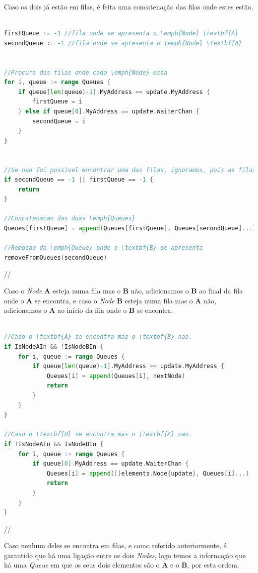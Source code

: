 Caso os dois já estão em filas, é feita uma concatenação das filas onde estes estão.
\begin{lstlisting}[caption={Alterações nas filas caso o \emph{Node} seja do tipo ``Waiter With Request'' e ambos os \emph{Nodes} \textbf{A} e \textbf{B} se apresentam em filas },language=Go]

firstQueue := -1 //fila onde se apresenta o \emph{Node} \textbf{A}
secondQueue := -1 //fila onde se apresenta o \emph{Node} \textbf{A}


//Procura das filas onde cada \emph{Node} esta
for i, queue := range Queues {
	if queue[len(queue)-1].MyAddress == update.MyAddress {
		firstQueue = i
	} else if queue[0].MyAddress == update.WaiterChan {
		secondQueue = i
	}
}


//Se nao foi possivel encontrar uma das filas, ignoramos, pois as filas ja se encontram juntas
if secondQueue == -1 || firstQueue == -1 {
	return
}

//Concatenacao das duas \emph{Queues}
Queues[firstQueue] = append(Queues[firstQueue], Queues[secondQueue]...)

//Remocao da \emph{Queue} onde o \textbf{B} se apresenta
removeFromQueues(secondQueue)
\end{lstlisting}//



Caso o \emph{Node} \textbf{A} esteja numa fila mas o \textbf{B} não, adicionamos o \textbf{B} ao final da fila onde o \textbf{A} se encontra, e
caso o \emph{Node} \textbf{B} esteja numa fila mas o \textbf{A} não, adicionamos o \textbf{A} ao início da fila onde o \textbf{B} se encontra.
\begin{lstlisting}[caption={Alterações nas filas caso o \emph{Node} seja do tipo ``Waiter With Request'' e pelo menos um se apresenta numa fila. },language=Go]

//Caso o \textbf{A} se encontra mas o \textbf{B} nao.
if IsNodeAIn && !IsNodeBIn {
	for i, queue := range Queues {
		if queue[len(queue)-1].MyAddress == update.MyAddress {
			Queues[i] = append(Queues[i], nextNode)
			return
		}
	}
}

//Caso o \textbf{B} se encontra mas o \textbf{A} nao.
if !IsNodeAIn && IsNodeBIn {
	for i, queue := range Queues {
		if queue[0].MyAddress == update.WaiterChan {
			Queues[i] = append([]elements.Node{update}, Queues[i]...)
			return
		}
	}
}


\end{lstlisting}//


Caso nenhum deles se encontra em filas, e como referido anteriormente, é garantido que há uma ligação entre os dois \emph{Nodes}, logo temos a informação que há uma \emph{Queue} em que os seus dois elementos são o \textbf{A} e o \textbf{B}, por esta ordem.

